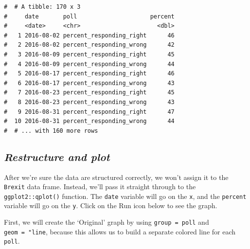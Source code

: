 \documentclass[letterpaper,12pt,twoside,]{pinp}
\begin{document}
\begin{ShadedResult}
\begin{verbatim}
#  # A tibble: 170 x 3
#     date       poll                     percent
#     <date>     <chr>                      <dbl>
#   1 2016-08-02 percent_responding_right      46
#   2 2016-08-02 percent_responding_wrong      42
#   3 2016-08-09 percent_responding_right      45
#   4 2016-08-09 percent_responding_wrong      44
#   5 2016-08-17 percent_responding_right      46
#   6 2016-08-17 percent_responding_wrong      43
#   7 2016-08-23 percent_responding_right      45
#   8 2016-08-23 percent_responding_wrong      43
#   9 2016-08-31 percent_responding_right      47
#  10 2016-08-31 percent_responding_wrong      44
#  # ... with 160 more rows
\end{verbatim}
\end{ShadedResult}

\hypertarget{restructure-and-plot}{%
\subsection{\texorpdfstring{\textbf{\emph{Restructure and
plot}}}{Restructure and plot}}\label{restructure-and-plot}}

After we're sure the data are structured correctly, we won't assign it
to the \texttt{Brexit} data frame. Instead, we'll pass it straight
through to the \texttt{ggplot2::qplot()} function. The \texttt{date}
variable will go on the \texttt{x}, and the \texttt{percent} variable
will go on the \texttt{y}. Click on the Run icon below to see the graph.

First, we will create the `Original' graph by using
\texttt{group\ =\ poll} and \texttt{geom\ =\ "line\textquotesingle{}},
because this allows us to build a separate colored line for each
\texttt{poll}.

\begin{Shaded}
\begin{Highlighting}[]
\SpecialCharTok{\%\textgreater{}\%} 
  \NormalTok{(} \SpecialCharTok{{-}}
                \NormalTok{, }
                \NormalTok{) }\SpecialCharTok{\%\textgreater{}\%} 
\SpecialCharTok{::}\NormalTok{(}
                  \NormalTok{,}
\end{Highlighting}
\end{Shaded}
\end{document}
